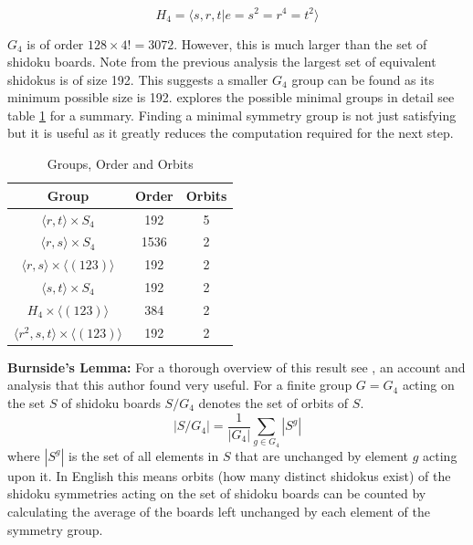 \documentclass[a4paper,11pt]{report}
\begin{document}
\begin{equation}H_4 = \langle s,r,t | e=s^2=r^4=t^2\rangle\end{equation}

$G_4$ is of order $128\times 4!=3072$. However, this is much larger than the set of shidoku boards. Note from the previous analysis the largest set of equivalent shidokus is of size 192. This suggests a smaller $G_4$ group can be found as its minimum possible size is 192. \cite{arnold2013minimal} explores the possible minimal groups in detail see table \ref{table:group} for a summary. Finding a minimal symmetry group is not just satisfying but it is useful as it greatly reduces the computation required for the next step.

\begin{table}[!h]
\begin{center}
\begin{tabular}{ |c|c|c| }
\hline
Group & Order & Orbits\\
\hline
$\langle r,t \rangle \times S_4$ & 192 & 5\\
$\langle r,s \rangle \times S_4$ & 1536 & 2\\
$\langle r,s \rangle \times \langle (123)\rangle$ & 192 & 2\\
$\langle s,t \rangle \times S_4$ & 192 & 2\\
$H_4 \times\langle (123) \rangle $ & 384 & 2\\
$\langle r^2,s,t \rangle \times \langle (123) \rangle$ & 192 & 2\\
\hline
\end{tabular}
\end{center}
\caption{\label{table:group}Groups, Order and Orbits}
\end{table}

\textbf{Burnside's Lemma:} For a thorough overview of this result see \cite{jin2018analysis}, an account and analysis that this author found very useful. For a finite group $G=G_4$ acting on the set $S$ of shidoku boards $S/G_4$ denotes the set of orbits of $S$. 
\begin{equation} |S/G_4|=\frac{1}{|G_4|}\sum_{g\in G_4}|S^g|\end{equation}
where $|S^g|$ is the set of all elements in $S$ that are unchanged by element $g$ acting upon it. In English this means orbits (how many distinct shidokus exist) of the shidoku symmetries acting on the set of shidoku boards can be counted by calculating the average of the boards left unchanged by each element of the symmetry group. 
\end{document}
